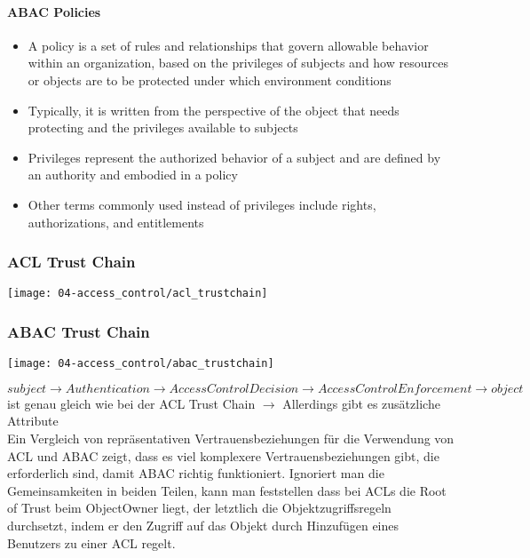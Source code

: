 \paragraph{ABAC Policies}
\begin{itemize}
    \item A policy is a set of rules and relationships that govern allowable behavior within an organization, based on the privileges of subjects and how resources or objects are to be protected under which environment conditions
    \item Typically, it is written from the perspective of the object that needs protecting and the privileges available to subjects
    \item Privileges represent the authorized behavior of a subject and are defined by an authority and embodied in a policy
    \item Other terms commonly used instead of privileges include rights, authorizations, and entitlements
\end{itemize}

\newpage

\subsubsection{ACL Trust Chain}
\begin{center}
    \texttt{[image: 04-access\_control/acl\_trustchain]}
    \vspace{-8pt}
\end{center}

\subsubsection{ABAC Trust Chain}
\begin{center}
    \texttt{[image: 04-access\_control/abac\_trustchain]}
    \vspace{-8pt}
\end{center}

$subject \rightarrow Authentication \rightarrow Access Control Decision \rightarrow Access Control Enforcement \rightarrow object$\\
ist genau gleich wie bei der ACL Trust Chain $\rightarrow$ Allerdings gibt es zusätzliche Attribute\\

Ein Vergleich von repräsentativen Vertrauensbeziehungen für die Verwendung von ACL und ABAC zeigt, dass es viel komplexere Vertrauensbeziehungen gibt, die erforderlich sind, damit ABAC richtig funktioniert. Ignoriert man die Gemeinsamkeiten in beiden Teilen, kann man feststellen dass bei ACLs die Root of Trust beim ObjectOwner liegt, der letztlich die Objektzugriffsregeln durchsetzt, indem er den Zugriff auf das Objekt durch Hinzufügen eines Benutzers zu einer ACL regelt.

